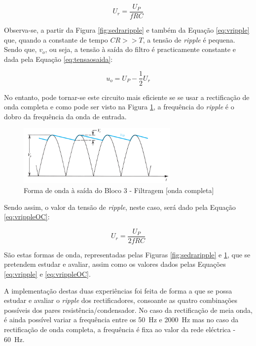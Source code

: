 \begin{equation} \label{eq:vripple}
	U_{r} = \frac{U_{P}}{fRC}
\end{equation}

Observa-se, a partir da Figura \ref{fig:sedraripple} e também da Equação \ref{eq:vripple} que, quando a constante de tempo $CR >> T$, a tensão de \textit{ripple} é pequena. Sendo que, $v_{o}$, ou seja, a tensão à saída do filtro é practicamente constante e dada pela Equação \ref{eq:tensaosaida}:

\begin{equation} \label{eq:tensaosaida}
	u_{o} = U_{P} - \dfrac{1}{2}U_{r}	
\end{equation}

No entanto, pode tornar-se este circuito mais eficiente se se usar a rectificação de onda completa e como pode ser visto na Figura \ref{fig:sedraripplecompleta}, a frequência do \textit{ripple} é o dobro da frequência da onda de entrada.

\begin{figure}[hbtp]
	\centering
	\includegraphics[width=0.7\textwidth]{figures/sedra_ripple_OC.png}
	\caption{Forma de onda à saída do Bloco 3 - Filtragem [onda completa] \cite{sedrasmith}}
	\label{fig:sedraripplecompleta}
\end{figure}

Sendo assim, o valor da tensão de \textit{ripple}, neste caso, será dado pela Equação \ref{eq:vrippleOC}:

\begin{equation} \label{eq:vrippleOC}
	U_{r} = \frac{U_{P}}{2fRC}
\end{equation}

São estas formas de onda, representadas pelas Figuras \ref{fig:sedraripple} e \ref{fig:sedraripplecompleta}, que se pretendem estudar e avaliar, assim como os valores dados pelas Equações \ref{eq:vripple} e \ref{eq:vrippleOC}.

A implementação destas duas experiências foi feita de forma a que se possa estudar e avaliar o \textit{ripple} dos rectificadores, consoante as quatro combinações possíveis dos pares resistência/condensador. No caso da rectificação de meia onda, é ainda possível variar a frequência entre os \SI{50}{\hertz} e \SI{2000}{\hertz} mas no caso da rectificação de onda completa, a frequência é fixa ao valor da rede eléctrica - \SI{60}{\hertz}.

